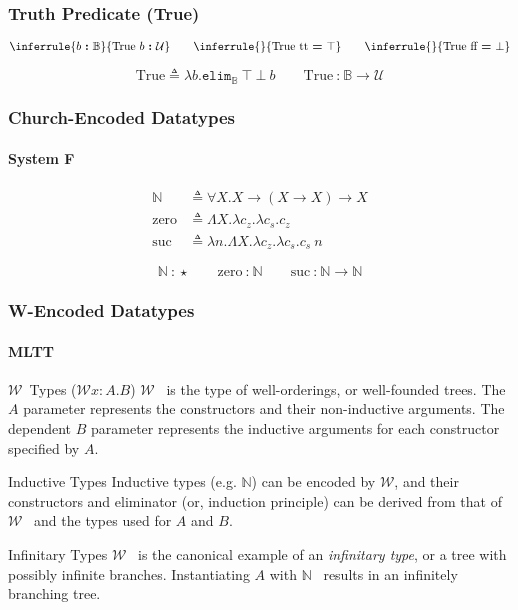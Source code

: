 \documentclass[mathserif]{beamer}
\newcommand{\txt}[1]{\textrm{#1}}
\newcommand{\defeq}[0]{\ensuremath{\triangleq}}
\newcommand{\isterm}[2]{\ensuremath{#1 ~\textbf{{:}}~ #2}}
\newcommand{\eqtype}[2]{\ensuremath{#1 ~\textbf{=}~ #2}}
\newcommand{\Arr}[2]{\ensuremath{#1 \rightarrow #2}}
\newcommand{\Allv}[2]{\ensuremath{\forall #1. #2}}
\newcommand{\All}[1]{\Allv{X}{#1}}
\newcommand{\allv}[2]{\ensuremath{\Lambda #1. #2}}
\newcommand{\all}[1]{\allv{X}{#1}}
\newcommand{\funv}[2]{\ensuremath{\lambda #1. #2}}
\newcommand{\app}[2]{\ensuremath{#1~#2}}
\newcommand{\Type}[0]{\ensuremath{\mathcal{U}}}
\newcommand{\Unit}[0]{\ensuremath{\top}}
\newcommand{\Bot}[0]{\ensuremath{\bot}}
\newcommand{\Truek}[0]{\txt{True}}
\newcommand{\True}[1]{\ensuremath{\Truek~#1}}
\newcommand{\Bool}[0]{\ensuremath{\mathbb{B}}}
\newcommand{\true}[0]{\ensuremath{\txt{tt}}}
\newcommand{\false}[0]{\ensuremath{\txt{ff}}}
\newcommand{\elimBool}[3]{\ensuremath{\texttt{elim}_{\Bool}~#1~#2~#3}}
\newcommand{\Nat}[0]{\ensuremath{\mathbb{N}}}
\newcommand{\zero}[0]{\ensuremath{\txt{zero}}}
\newcommand{\suck}[0]{\ensuremath{\txt{suc}}}
\newcommand{\Wellk}[0]{\ensuremath{\mathcal{W}}}
\newcommand{\Wellv}[3]{\ensuremath{\Wellk #1{:}#2. #3}}
\newcommand{\Well}[2]{\Wellv{x}{#1}{#2}}
\begin{document}
\begin{frame}
\frametitle{Truth Predicate (\Truek)}

$$
\inferrule{
  {\isterm{b}{\Bool}}
}
{\isterm{\True{b}}{\Type}}
\qquad
\inferrule{{}}
{\eqtype{\True{\true}}{\Unit}}
\qquad
\inferrule{{}}
{\eqtype{\True{\false}}{\Bot}}
$$

\hrulefill

$$
\Truek \defeq \funv{b}{\elimBool{\Unit}{\Bot}{b}}
\qquad
\isterm{\Truek}{\Arr{\Bool}{\Type}}
$$

\end{frame}

\begin{frame}
\frametitle{Church-Encoded Datatypes}
\framesubtitle{System F}

\begin{align*}
\Nat &\defeq \All{\Arr{X}{\Arr{(\Arr{X}{X})}{X}}} \\
\zero &\defeq \all{\funv{c_z}{\funv{c_s}{c_z}}} \\
\suck &\defeq \funv{n}{\all{\funv{c_z}{\funv{c_s}{\app{c_s}{n}}}}}
\end{align*}

$$
\isterm{\Nat}{\star}
\qquad
\isterm{\zero}{\Nat}
\qquad
\isterm{\suck}{\Arr{\Nat}{\Nat}}
$$

\end{frame}

\begin{frame}
\frametitle{W-Encoded Datatypes}
\framesubtitle{MLTT}

\begin{block}{\Wellk~Types (\Well{A}{B})}
\Wellk~ is the type of well-orderings,
or well-founded trees.
The $A$ parameter represents the constructors and their
non-inductive arguments. The dependent $B$ parameter represents
the inductive arguments for each constructor
specified by $A$.
\end{block}

\begin{block}{Inductive Types}
Inductive types (e.g. \Nat) can be encoded by \Wellk, and
their constructors and eliminator (or, induction principle)
can be derived from that of \Wellk~ and the types used for
$A$ and $B$.
\end{block}

\begin{block}{Infinitary Types}
\Wellk~ is the canonical example of an \textit{infinitary type},
or a tree with possibly infinite branches. Instantiating $A$
with \Nat~ results in an infinitely branching tree.
\end{block}

\end{frame}
\end{document}
